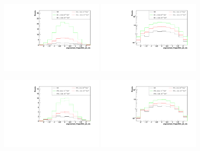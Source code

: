\begin{figure}[h]
  \begin{center}
	\includegraphics[width=0.45\textwidth]{Plots/aQGC_kinematics/ungroomed_PuppiAK8_jet_eta_FS1.pdf}%
	\includegraphics[width=0.45\textwidth]{Plots/aQGC_kinematics/ungroomed_PuppiAK8_jet_eta_FS1_log.pdf}\\		
    \caption{}
  \end{center}
\end{figure}
\begin{figure}[h]
  \begin{center}
	\includegraphics[width=0.45\textwidth]{Plots/aQGC_kinematics/ungroomed_PuppiAK8_jet_eta_FT0.pdf}%
	\includegraphics[width=0.45\textwidth]{Plots/aQGC_kinematics/ungroomed_PuppiAK8_jet_eta_FT0_log.pdf}\\		
    \caption{}
  \end{center}
\end{figure}
